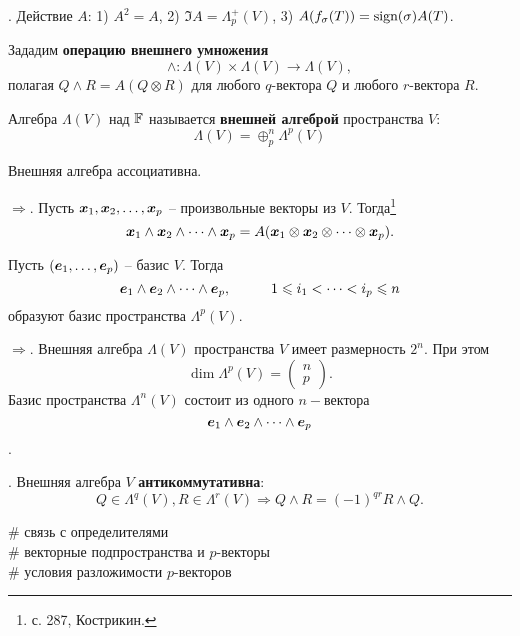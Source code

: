 \noindent
\socrat. Действие $A$: 1) $A^2 = A$, 2) $\Im A = \Lambda^+_p (V)$, 3) $A(f_{\sigma}(T)) = \text{sign}(\sigma) A(T)$.

\marginpar{\small $\wedge$}

\begin{to_def}
    Зададим \textbf{операцию внешнего умножения}
    \begin{equation}
        \wedge \colon \Lambda(V) \times \Lambda(V) \to \Lambda (V),
    \end{equation}
    полагая 
    $
        Q \wedge R = A(Q \otimes R)
    $
    для любого $q$-вектора $Q$ и любого $r$-вектора $R$. 
\end{to_def}

\begin{to_def}
    Алгебра $\Lambda (V)$ над $\mathbb{F}$ называется \textbf{внешней алгеброй} пространства $V$:
    \begin{equation}
        \Lambda(V) = \oplus_p^n \Lambda^p (V)
    \end{equation}
\end{to_def}

\begin{to_thr}
    Внешняя алгебра ассоциативна.
\end{to_thr}

\noindent
$\boxed{\Rightarrow}$. Пусть $\mbox{\boldmath $x$}_1, \mbox{\boldmath $x$}_2, \dots, \mbox{\boldmath $x$}_p$ -- произвольные векторы из $V$. Тогда\footnote{
    с. 287, Кострикин.
} 
\begin{equation}
    \mbox{\boldmath $x$}_1 \wedge \mbox{\boldmath $x$}_2 \wedge \dots \wedge \mbox{\boldmath $x$}_p = A(\mbox{\boldmath $x$}_1 \otimes \mbox{\boldmath $x$}_2 \otimes \dots \otimes \mbox{\boldmath $x$}_p).
\end{equation}

\begin{to_thr}
    Пусть $(\mbox{\boldmath $e$}_1, \dots, \mbox{\boldmath $e$}_p)$ -- базис $V$. Тогда 
    \begin{equation}
        \mbox{\boldmath $e$}_1 \wedge \mbox{\boldmath $e$}_2 \wedge \dots \wedge \mbox{\boldmath $e$}_p, \hspace{1cm} 1 \leqslant i_1 < \dots < i_p \leqslant n
    \end{equation}
    образуют базис пространства $\Lambda^p(V)$.
\end{to_thr}

\noindent
$\boxed{\Rightarrow}$. Внешняя алгебра $\Lambda(V)$ пространства $V$ имеет размерность $2^n$. При этом 
\begin{equation}
    \dim \Lambda^p (V) = \begin{pmatrix}
        n \\ p
    \end{pmatrix}.
\end{equation}
Базис пространства $\Lambda^n (V)$ состоит из одного $n-$вектора $$\mbox{\boldmath $e$}_1 \wedge \mbox{\boldmath $e$}_2 \wedge \dots \wedge \mbox{\boldmath $e$}_p$$.

\noindent
\socrat. Внешняя алгебра $V$ \textbf{антикоммутативна}:
\begin{equation}
    Q \in \Lambda^q(V), R \in \Lambda^r(V) \Rightarrow Q \wedge R = (-1)^{qr} R \wedge Q.
\end{equation}


\noindent
\# связь с определителями\\
\# векторные подпространства и $p$-векторы\\
\# условия разложимости $p$-векторов
